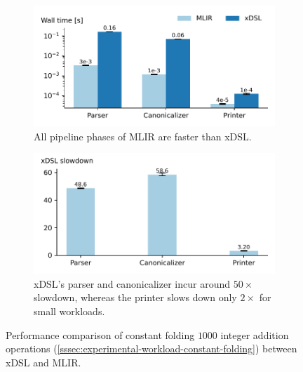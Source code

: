 \begin{figure}[H]
    \centering
    \begin{subfigure}[b]{0.45\textwidth}
        \includegraphics[width=\textwidth]{images/measuring_compiler_performance/walltimes.pdf}
        \vspace{0.5em}
        \caption{All pipeline phases of MLIR are faster than xDSL.}
        \vspace{0.5em}
        \label{fig:end-to-end-constant-folding-walltime}
    \end{subfigure}
    \hfill
    \begin{subfigure}[b]{0.45\textwidth}
        \includegraphics[width=\textwidth]{images/measuring_compiler_performance/speedup.pdf}
        \caption{xDSL's parser and canonicalizer incur around $50\times$ slowdown, whereas the printer slows down only $2\times$ for small workloads.}
        \label{fig:end-to-end-constant-folding-speedup}
    \end{subfigure}
    \caption{Performance comparison of constant folding $1000$ integer addition operations (\autoref{sssec:experimental-workload-constant-folding}) between xDSL and MLIR.}
    \label{fig:end-to-end-constant-folding}
\end{figure}


